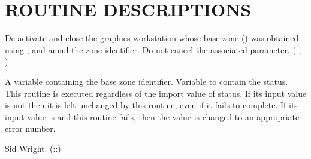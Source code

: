 \section{ROUTINE DESCRIPTIONS}
\begin{manroutinedescription}
     De-activate and close the graphics workstation whose base zone
     ({}) was obtained using {}, and annul
     the zone identifier.
     Do not cancel the associated parameter.
     {} {} ( {}, {} )
\begin{manparametertable}
           A variable containing the base zone identifier.
           Variable to contain the status. This routine is executed
           regardless of the import value of status.
           If its input value is not {} then it is left %
unchanged
           by this routine, even if it fails to complete.   If its
           input value is {} and this routine fails, then the
           value is changed to an appropriate error number.
\end{manparametertable}
     Sid Wright. ({}::{})
\end{manroutinedescription}
